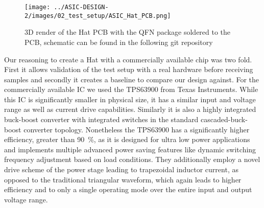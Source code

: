 \begin{figure}[h]
    \centering
    \texttt{[image: ../ASIC-DESIGN-2/images/02\_test\_setup/ASIC\_Hat\_PCB.png]}
    \caption{3D render of the Hat PCB with the QFN package soldered to the PCB, schematic can be found in the following git repository \cite{PCB_schematic}}
    \label{fig:ASIC_Hat}
\end{figure}


Our reasoning to create a Hat with a commercially available chip was two fold. First it allows validation of the test setup with a real hardware before receiving samples and secondly it creates a baseline to compare our design against. For the commercially available \ac{IC} we used the TPS63900 from Texas Instruments. While this \ac{IC} is significantly smaller in physical size, it has a similar input and voltage range as well as current drive capabilities. Similarly it is also a highly integrated buck-boost converter with integrated switches in the standard cascaded-buck-boost converter topology. Nonetheless the TPS63900 has a significantly higher efficiency, greater than \qty{90}{\percent}\cite{tps63900}, as it is designed for ultra low power applications and implements multiple advanced power saving features like dynamic switching frequency adjustment based on load conditions\cite{tps63900}. They additionally employ a novel drive scheme of the power stage leading to trapezoidal inductor current, as opposed to the traditional triangular waveform, which again leads to higher efficiency and to only a single operating mode over the entire input and output voltage range\cite{tps63900}. 